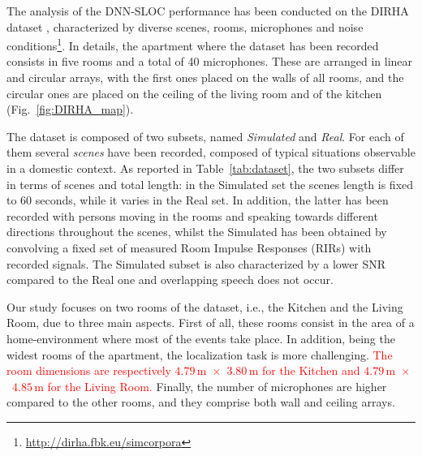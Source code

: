 \documentclass[review]{elsarticle}
\newcommand{\figref}[1]{Fig.~\ref{#1}}
\newcommand{\tableref}[1]{Table~\ref{#1}}
\begin{document}
The analysis of the DNN-SLOC performance has been conducted on the DIRHA dataset \cite{cristoforetti2014dirha}, characterized by diverse scenes, rooms, microphones and noise conditions\footnote{\url{http://dirha.fbk.eu/simcorpora}}. In details, the apartment where the dataset has been recorded consists in five rooms and a total of 40 microphones. These are arranged in linear and circular arrays, with the first ones placed on the walls of all rooms, and the circular ones are placed on the ceiling of the living room and of the kitchen (\figref{fig:DIRHA_map}).

The dataset is composed of two subsets, named \emph{Simulated} and \emph{Real}. For each of them several \textit{scenes} have been recorded, composed of typical situations observable in a domestic context. As reported in \tableref{tab:dataset}, the two subsets differ in terms of scenes and total length: in the Simulated set the scenes length is fixed to 60 seconds, while it varies in the Real set. In addition, the latter has been recorded with persons moving in the rooms and speaking towards different directions throughout the scenes, whilst the Simulated has been obtained by convolving a fixed set of measured Room Impulse Responses (RIRs) with recorded signals.
The Simulated subset is also characterized by a lower SNR compared to the Real one and overlapping speech does not occur.

Our study focuses on two rooms of the dataset, i.e.,  the Kitchen and the Living Room, due to three main aspects. First of all, these rooms consist in the area of a home-environment where most of the events take place. In addition, being the widest rooms of the apartment, the localization task is more challenging. \textcolor{red}{The room dimensions are respectively $4.79$\,m~$\times$~$3.80$\,m for the Kitchen and $4.79$\,m~$\times$~$4.85$\,m for the Living Room.}
Finally, the number of microphones are higher compared to the other rooms, and they comprise both wall and ceiling arrays.
\end{document}
